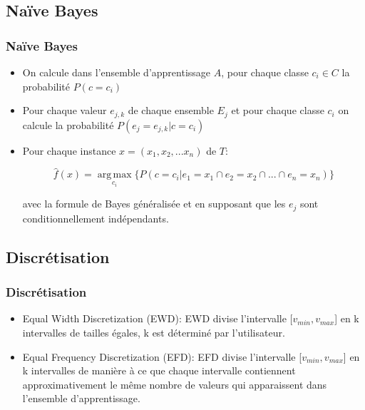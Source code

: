 	\subsection{Naïve Bayes}
	\begin{frame}
	\frametitle{Naïve Bayes}
	\begin{itemize}
	\item On calcule dans l'ensemble d'apprentissage $A$, pour chaque classe $c_{i}\in C$ la probabilité $P(c=c_{i})$
	\item Pour chaque valeur $e_{j,k}$ de chaque ensemble $E_{j}$ et pour chaque classe $c_{i}$ on calcule la probabilité $P(e_{j}=e_{j,k}|c=c_{i})$
	\item Pour chaque instance $x=(x_{1},x_{2},...x_{n})$ de $T$:
	\begin{center}
	\[\hat{f}(x)=\operatorname*{arg\,max}_{c_{i}} \lbrace P(c=c_{i}|e_{1}=x_{1}\cap e_{2}=x_{2}\cap ...\cap e_{n}=x_{n})\rbrace\]
	\end{center}
	avec la formule de Bayes généralisée et en supposant que les $e_{j}$ sont conditionnellement indépendants.
	\end{itemize}
	\end{frame}
	\subsection{Discrétisation}
	\begin{frame}
	\frametitle{Discrétisation}
	\begin{itemize}
		\item Equal Width Discretization (EWD):
		EWD divise l'intervalle [$ v_{min},v_{max} $] en k intervalles de tailles égales, k est déterminé par l'utilisateur.\\

		\item Equal Frequency Discretization (EFD):
		EFD divise l'intervalle [$v_{min},v_{max} $] en k intervalles de manière à ce que chaque intervalle contiennent approximativement le même nombre de valeurs qui apparaissent dans l'ensemble d'apprentissage.
	\end{itemize}
	\end{frame}
	